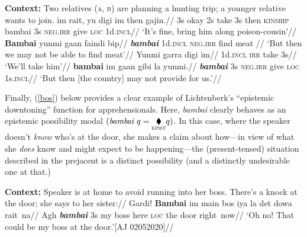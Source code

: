 \pex[everylabel=\sc]\textbf{Context:} Two relatives \textsc{(a, b)} are planning a hunting trip; a younger relative wants to join.
\a\begingl\gla im rait, yu digi im then gajin.//
\glb 3s okay 2s take 3s then \textsc{kinship}  bambai 3s \textsc{neg.irr} give \textsc{loc} 1d.\textsc{incl}//
\glft`It's fine, bring him along poison-cousin'//
\endgl
\a\begingl\gla  \textbf{Bambai} yunmi gaan faindi bip//
\glb \textbf{\textit{\textit{bambai}}} 1d\textsc{.incl} \textsc{neg.irr} find meat //
\glft`But then we may not be able to find meat'//
\endgl
\a[label=a]\begingl\gla Yunmi garra digi im//
\glb 1d\textsc{.incl} \textsc{irr} take 3s//
\glft`We'll take him'//
\endgl
\a[label=b]\begingl\gla \textbf{bambai} im gaan gibi la yunmi.//
\glb \textit{\textbf{bambai}} 3s \textsc{neg.irr} give \textsc{loc} 1s\textsc{.incl}//
\glft `But then [the country] may not provide for us.'\trailingcitation{[DW 20170712]}//\endgl
\xe


Finally, (\ref{bos}) below provides a clear example of Lichtenberk's \citeyearpar{Lichtenberk1995} ``epistemic downtoning'' function for apprehensionals. Here, \textit{bambai} clearly behaves as an epistemic possibility modal $ (\textit{bambai }q=\underset{\textsc{epist}}{\blacklozenge} q) $. In this case, where the speaker doesn't \textit{know} who's at the door, she makes a claim about how---in view of what she \textit{does} know and might expect to be happening---the (present-tensed) situation described in the prejacent is a distinct possibility (and a distinctly undesirable one at that.)



	\ex\label{bos}\begingl\glpreamble\textup{\textbf{Context:} Speaker is at home to avoid running into her boss. There's a knock at the door; she says to her sister:}//
	\gla Gardi! \textbf{Bambai} im main bos iya la det dowa rait~na//
	\glb Agh \textit{\textbf{bambai}} 3s my boss here \textsc{loc} the door right~now//
	\glft`Oh no! That could be my boss at the door.'\hfill[AJ 02052020]//\endgl
\xe





